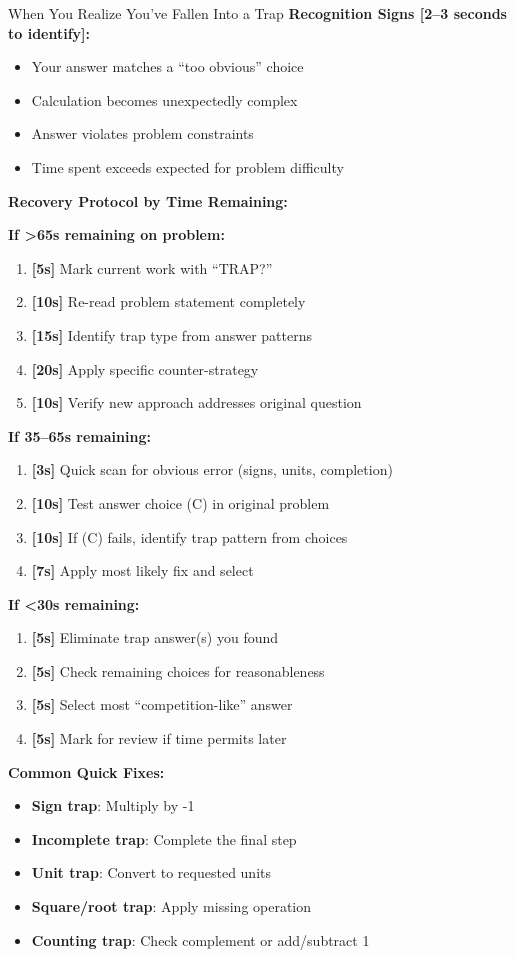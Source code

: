 \documentclass{article}
\begin{document}
\begin{trapbox}{When You Realize You've Fallen Into a Trap}
\textbf{Recognition Signs [2--3 seconds to identify]:}
\begin{itemize}[nosep]
\item Your answer matches a ``too obvious'' choice
\item Calculation becomes unexpectedly complex
\item Answer violates problem constraints
\item Time spent exceeds expected for problem difficulty
\end{itemize}

\textbf{Recovery Protocol by Time Remaining:}

\textbf{If >65s remaining on problem:}
\begin{enumerate}[nosep]
\item \textbf{[5s]} Mark current work with ``TRAP?'' 
\item \textbf{[10s]} Re-read problem statement completely
\item \textbf{[15s]} Identify trap type from answer patterns
\item \textbf{[20s]} Apply specific counter-strategy
\item \textbf{[10s]} Verify new approach addresses original question
\end{enumerate}

\textbf{If 35--65s remaining:}
\begin{enumerate}[nosep]
\item \textbf{[3s]} Quick scan for obvious error (signs, units, completion)
\item \textbf{[10s]} Test answer choice (C) in original problem
\item \textbf{[10s]} If (C) fails, identify trap pattern from choices
\item \textbf{[7s]} Apply most likely fix and select
\end{enumerate}

\textbf{If <30s remaining:}
\begin{enumerate}[nosep]
\item \textbf{[5s]} Eliminate trap answer(s) you found
\item \textbf{[5s]} Check remaining choices for reasonableness
\item \textbf{[5s]} Select most ``competition-like'' answer
\item \textbf{[5s]} Mark for review if time permits later
\end{enumerate}

\textbf{Common Quick Fixes:}
\begin{itemize}[nosep]
\item \textbf{Sign trap}: Multiply by -1
\item \textbf{Incomplete trap}: Complete the final step
\item \textbf{Unit trap}: Convert to requested units
\item \textbf{Square/root trap}: Apply missing operation
\item \textbf{Counting trap}: Check complement or add/subtract 1
\end{itemize}
\end{trapbox}
\end{document}
